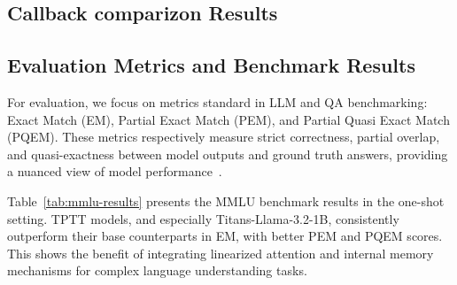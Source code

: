 \documentclass[10pt,a4paper]{article}
\begin{document}


\subsection{Callback comparizon Results}



\subsection{Evaluation Metrics and Benchmark Results}

For evaluation, we focus on metrics standard in LLM and QA benchmarking: Exact Match (EM), Partial Exact Match (PEM), and Partial Quasi Exact Match (PQEM). These metrics respectively measure strict correctness, partial overlap, and quasi-exactness between model outputs and ground truth answers, providing a nuanced view of model performance~\cite{hendrycks2020measuring}.

Table~\ref{tab:mmlu-results} presents the MMLU benchmark results in the one-shot setting. TPTT models, and especially Titans-Llama-3.2-1B, consistently outperform their base counterparts in EM, with better PEM and PQEM scores. This shows the benefit of integrating linearized attention and internal memory mechanisms for complex language understanding tasks.
\end{document}
